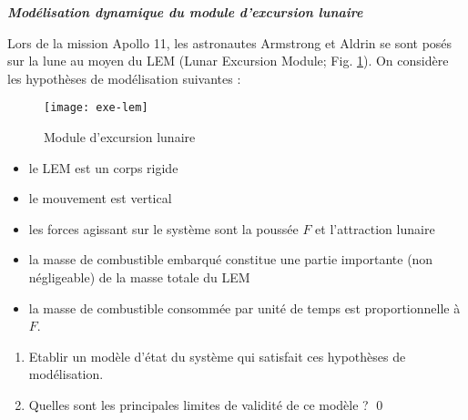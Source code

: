 \begin{exercice}{\bf \em Modélisation dynamique du module d'excursion
lunaire}

Lors de la mission Apollo 11, les astronautes Armstrong et Aldrin
se sont posés sur la lune au moyen du LEM (Lunar
Excursion Module; Fig. \ref{Fig:exe-lem}).  On considère les hypothèses de
modélisation suivantes :
\begin{figure}[ht]
\begin{center}
\texttt{[image: exe-lem]}
\caption{Module d'excursion lunaire}
\label{Fig:exe-lem}
\end{center}
\end{figure}
\begin{itemize}
\item[a)] le LEM est un corps rigide
\item[b)] le mouvement est vertical
\item[c)] les forces agissant sur le système sont la poussée $F$
et l'attraction lunaire
\item[d)] la masse de combustible embarqué constitue une partie
importante (non négligeable) de la masse totale du LEM
\item[e)] la masse de combustible consommée par unité de
temps est proportionnelle à $F$.
\end{itemize}
\begin{enumerate}
\item Etablir un modèle d'état du système qui satisfait ces
hypothèses de modélisation.
\item Quelles sont les principales limites de validité de ce
modèle ? \qed
\end{enumerate}
\end{exercice}
\vv

